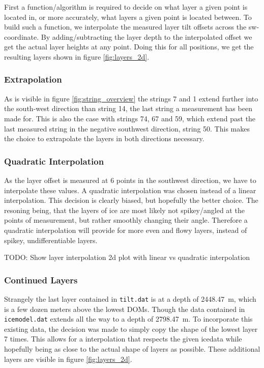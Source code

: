 \documentclass[a4paper,10pt]{scrartcl}
\begin{document}

First a function/algorithm is required to decide on what layer a given point is located in, or more accurately, what layers a given point is located between.
To build such a function, we interpolate the measured layer tilt offsets across the sw-coordinate.
By adding/subtracting the layer depth to the interpolated offset we get the actual layer heights at any point.
Doing this for all positions, we get the resulting layers shown in figure \ref{fig:layers_2d}.

\subsubsection*{Extrapolation}

As is visible in figure \ref{fig:string_overview} the strings 7 and 1 extend further into the south-west direction than string 14, the last string a measurement has been made for.
This is also the case with strings 74, 67 and 59, which extend past the last measured string in the negative southwest direction, string 50.
This makes the choice to extrapolate the layers in both directions necessary.

\subsubsection*{Quadratic Interpolation}

As the layer offset is measured at 6 points in the southwest direction, we have to interpolate these values.
A quadratic interpolation was chosen instead of a linear interpolation.
This decision is clearly biased, but hopefully the better choice.
The resoning being, that the layers of ice are most likely not spikey/angled at the points of measurement, but rather smoothly changing their angle.
Therefore a quadratic interpolation will provide for more even and flowy layers, instead of spikey, undifferentiable layers.

TODO: Show layer interpolation 2d plot with linear vs quadratic interpolation

\subsubsection*{Continued Layers}

Strangely the last layer contained in \texttt{tilt.dat} is at a depth of \SI{2448.47}{m}, which is a few dozen meters above the lowest DOMs.
Though the data contained in \texttt{icemodel.dat} extends all the way to a depth of \SI{2798.47}{m}.
To incorporate this existing data, the decision was made to simply copy the shape of the lowest layer 7 times.
This allows for a interpolation that respects the given icedata while hopefully being as close to the actual shape of layers as possible.
These additional layers are visible in figure \ref{fig:layers_2d}.
\end{document}
